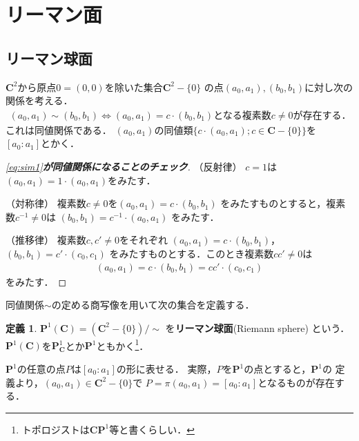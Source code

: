 \documentclass[11pt, a4paper, dvipdfmx, draft]{jsarticle}
\theoremstyle{definition}
\newtheorem{Definition}[Axiom]{定義}
\newcommand{\cc}{\mathbf{C}}
\newcommand{\pp}{\mathbf{P}}
\theoremstyle{mystyle}
\numberwithin{equation}{section} %
\begin{document}
\section{リーマン面}

\subsection{リーマン球面}

$\cc^{2}$から原点$0=(0,0)$を除いた集合$\cc^{2}-\{0\}$
の点$(a_{0},a_{1}), (b_{0},b_{1})$に対し次の関係を考える．
\begin{align}\label{eq:sim1}
    (a_{0},a_{1})\sim (b_{0},b_{1})
    \Longleftrightarrow
    (a_{0},a_{1})= c\cdot(b_{0},b_{1})
    \text{となる複素数}c\neq0\text{が存在する．}
\end{align}
これは同値関係である．
$(a_0,a_1)$の同値類$\{c\cdot(a_0,a_1); c\in\cc-\{0\}\}$を
$[a_0\colon a_1]$とかく．
\begin{proof}[\eqref{eq:sim1}\textbf{が同値関係になることのチェック}]
    
    （反射律）
    $c=1$は$(a_{0},a_{1})= 1\cdot(a_{0},a_{1})$をみたす．

    （対称律）
    複素数$c\neq0$を$(a_{0},a_{1})= c \cdot (b_{0},b_{1})$
    をみたすものとすると，複素数$c^{-1}\neq0$は
    $(b_{0},b_{1})=c^{-1} \cdot(a_{0},a_{1})$
    をみたす．

    （推移律）
    複素数$c,c'\neq0$をそれぞれ
    $(a_{0},a_{1})= c \cdot (b_{0},b_{1})$，
    $(b_{0},b_{1})= c' \cdot (c_{0},c_{1})$
    をみたすものとする．このとき複素数$cc'\neq0$は
    \begin{align*}
        (a_{0},a_{1})
        = c \cdot (b_{0},b_{1})
        =cc' \cdot (c_{0},c_{1})
    \end{align*}
    をみたす．
\end{proof}

同値関係${\sim}$の定める商写像を用いて次の集合を定義する．

\begin{Definition}
    $\pp^{1}(\cc) = \left(\cc^{2}-\{0\}\right)/{\sim}$
    を\textbf{リーマン球面}(Riemann sphere) という．
    $\pp^{1}(\cc)$を$\pp^{1}_{\cc}$とか$\pp^{1}$ともかく\footnote{トポロジストは$\cc\pp^1$等と書くらしい．}．
\end{Definition}

$\pp^1$の任意の点$P$は$[a_0\colon a_1]$の形に表せる．
実際，$P$を$\pp^1$の点とすると，$\pp^1$の
定義より，$(a_{0},a_{1})\in \cc^{2}-\{0\}$で
$P=\pi(a_{0},a_{1})=[a_0\colon a_1]$となるものが存在する．
\end{document}
